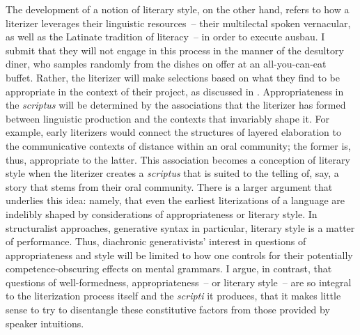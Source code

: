 The development of a notion of literary style, on the other hand, refers to how a literizer leverages their linguistic resources~-- their multilectal spoken vernacular, as well as the Latinate tradition of literacy~-- in order to execute ausbau. I submit that they will not engage in this process in the manner of the desultory diner, who samples randomly from the dishes on offer at an all-you-can-eat buffet. Rather, the literizer will make selections based on what they find to be appropriate in the context of their project, as discussed in . Appropriateness in the \textit{scriptus} will be determined by the associations that the literizer has formed between linguistic production and the contexts that invariably shape it. For example, early literizers would connect the structures of layered elaboration to the communicative contexts of distance within an oral community; the former is, thus, appropriate to the latter. This association becomes a conception of literary style when the literizer creates a \textit{scriptus} that is suited to the telling of, say, a story that stems from their oral community. There is a larger argument that underlies this idea: namely, that even the earliest literizations of a language are indelibly shaped by considerations of appropriateness or literary style. In structuralist approaches, generative syntax in particular, literary style is a matter of performance. Thus, diachronic generativists’ interest in questions of appropriateness and style will be limited to how one controls for their potentially competence-obscuring effects on mental grammars. I argue, in contrast, that questions of well-formedness, appropriateness~-- or literary style~-- are so integral to the literization process itself and the \textit{scripti} it produces, that it makes little sense to try to disentangle these constitutive factors from those provided by speaker intuitions.

